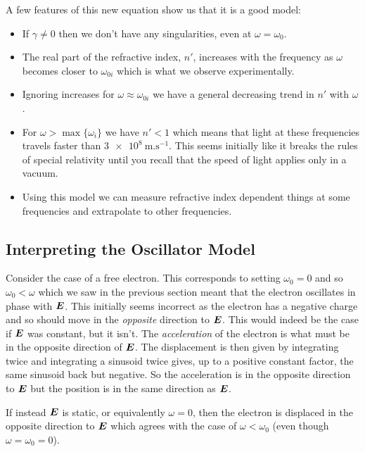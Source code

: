     A few features of this new equation show us that it is a good model:
    \begin{itemize}
        \item If \(\gamma \ne 0\) then we don't have any singularities, even at \(\omega = \omega_0\).
        
        \item The real part of the refractive index, \(n'\), increases with the frequency as \(\omega\) becomes closer to \(\omega_{0i}\) which is what we observe experimentally.
        
        \item Ignoring increases for \(\omega \approx \omega_{0i}\) we have a general decreasing trend in \(n'\) with \(\omega\).
        
        \item For \(\omega > \max\{\omega_i\}\) we have \(n' < 1\) which means that light at these frequencies travels faster than \(\SI{3e8}{\metre.\second^{-1}}\).
        This seems initially like it breaks the rules of special relativity until you recall that the speed of light applies only in a vacuum.
        
        \item Using this model we can measure refractive index dependent things at some frequencies and extrapolate to other frequencies.
    \end{itemize}

    \subsection{Interpreting the Oscillator Model}
    Consider the case of a free electron.
    This corresponds to setting \(\omega_0 = 0\) and so \(\omega_0 < \omega\) which we saw in the previous section meant that the electron oscillates in phase with \(\bm{E}\).
    This initially seems incorrect as the electron has a negative charge and so should move in the \emph{opposite} direction to \(\bm{E}\).
    This would indeed be the case if \(\bm{E}\) was constant, but it isn't.
    The \emph{acceleration} of the electron is what must be in the opposite direction of \(\bm{E}\).
    The displacement is then given by integrating twice and integrating a sinusoid twice gives, up to a positive constant factor, the same sinusoid back but negative.
    So the acceleration is in the opposite direction to \(\bm{E}\) but the position is in the same direction as \(\bm{E}\).
    
    If instead \(\bm{E}\) is static, or equivalently \(\omega = 0\), then the electron is displaced in the opposite direction to \(\bm{E}\) which agrees with the case of \(\omega < \omega_0\) (even though \(\omega = \omega_0 = 0\)).
    
